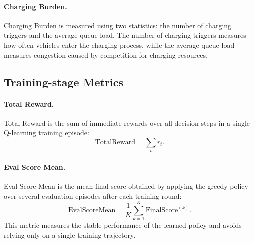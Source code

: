 \paragraph{Charging Burden.}
Charging Burden is measured using two statistics: the number of charging triggers and the average queue load. The number of charging triggers measures how often vehicles enter the charging process, while the average queue load measures congestion caused by competition for charging resources.

\subsection{Training-stage Metrics}

\paragraph{Total Reward.}
Total Reward is the sum of immediate rewards over all decision steps in a single Q-learning training episode:
\[
\mathrm{TotalReward}=
\sum_t r_t.
\]

\paragraph{Eval Score Mean.}
Eval Score Mean is the mean final score obtained by applying the greedy policy over several evaluation episodes after each training round:
\[
\mathrm{EvalScoreMean}
=
\frac{1}{K}\sum_{k=1}^{K}\mathrm{FinalScore}^{(k)}.
\]
This metric measures the stable performance of the learned policy and avoids relying only on a single training trajectory.
